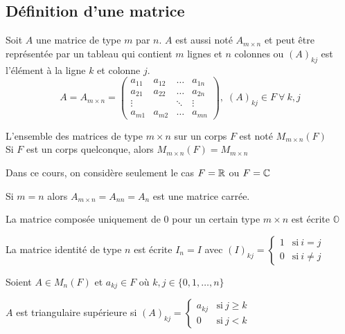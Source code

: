 
\subsection{Définition d'une matrice}
\begin{definition}
    Soit $A$ une matrice de type $m$ par $n$. $A$ est aussi noté $A_{m \times n}$ et peut être représentée
    par un tableau qui contient $m$ lignes et $n$ colonnes ou $\left(A\right)_{kj}$ est l'élément
    à la ligne $k$ et colonne $j$. \[
        A = A_{m \times n} = \begin{pmatrix}
            a_{11} & a_{12}      & \dots  & a_{1n} \\
            a_{21} & a_{22}      & \dots  & a_{2n} \\
            \vdots &             & \ddots & \vdots \\
            a_{m1} & a_{m2}      & \dots  & a_{mn}
        \end{pmatrix}, \; \left(A\right)_{kj} \in F \ \forall \ k, j
    \]
\end{definition}
\begin{definition}
    L'ensemble des matrices de type $m \times n$ sur un corps $F$ est noté $M_{m \times n}(F)$ \\
    Si $F$ est un corps quelconque, alors $M_{m \times n}(F) = M_{m \times n}$
\end{definition}
\begin{note}
    Dans ce cours, on considère seulement le cas $F = \mathbb{R}$ ou $F = \mathbb{C}$
\end{note}
\begin{definition}
    Si $m = n$ alors $A_{m \times n} = A_{nn} = A_n$ est une matrice carrée.
\end{definition}
\begin{definition}
    La matrice composée uniquement de 0 pour un certain type $m \times n$ est écrite $\mathbb{O}$
\end{definition}
\begin{definition}
    La matrice identité de type $n$ est écrite $I_n = I$ avec $(I)_{kj} = \begin{cases}
            1 & \text{si} \ i = j    \\
            0 & \text{si} \ i \neq j
        \end{cases}$
\end{definition}
Soient $A \in M_n(F)$ et $a_{kj} \in F$ où $k, j \in \{0, 1, \dots, n\}$
\begin{definition}
    $A$ est triangulaire supérieure si $(A)_{kj} = \begin{cases}
            a_{kj} & \text{si} \ j \geq k \\
            0      & \text{si} \ j < k
        \end{cases}$
\end{definition}
